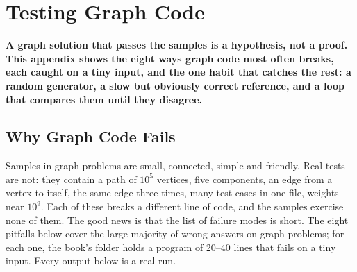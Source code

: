 \chapter{Testing Graph Code}
\label{ch:testing}

\providecommand{\clfile}[1]{\texttt{\detokenize{#1}}}
\providecommand{\clneed}{\par\vspace{0pt plus 8\baselineskip}\penalty-200\vspace{0pt plus -8\baselineskip}}

\begin{tcolorbox}[enhanced, colback=white, colframe=secondaryblue, boxrule=1pt, arc=2mm, left=10pt, right=10pt]
\textbf{\large\textcolor{primaryblue}{A graph solution that passes the samples is a hypothesis, not a proof. This appendix shows the eight ways graph code most often breaks, each caught on a tiny input, and the one habit that catches the rest: a random generator, a slow but obviously correct reference, and a loop that compares them until they disagree.}}
\end{tcolorbox}

\chaptercontents

\clneed
\section{Why Graph Code Fails}
\label{sec:ts-why}

Samples in graph problems are small, connected, simple and friendly. Real tests are not: they contain a path of $10^5$ vertices, five components, an edge from a vertex to itself, the same edge three times, many test cases in one file, weights near $10^9$. Each of these breaks a different line of code, and the samples exercise none of them. The good news is that the list of failure modes is short. The eight pitfalls below cover the large majority of wrong answers on graph problems; for each one, the book's folder \clfile{code/examples/pitfalls/} holds a program of 20--40 lines that fails on a tiny input. Every output below is a real run.

